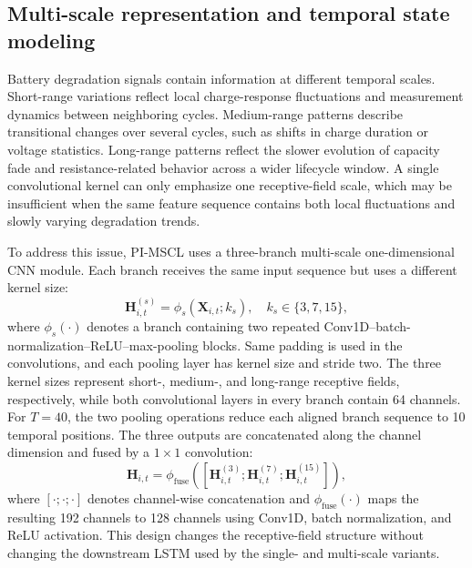 \documentclass[pdflatex,sn-mathphys-num]{sn-jnl}
\begin{document}
\subsection{Multi-scale representation and temporal state modeling}
\label{subsec:multiscale}

Battery degradation signals contain information at different temporal scales. Short-range variations reflect local charge-response fluctuations and measurement dynamics between neighboring cycles. Medium-range patterns describe transitional changes over several cycles, such as shifts in charge duration or voltage statistics. Long-range patterns reflect the slower evolution of capacity fade and resistance-related behavior across a wider lifecycle window. A single convolutional kernel can only emphasize one receptive-field scale, which may be insufficient when the same feature sequence contains both local fluctuations and slowly varying degradation trends.

To address this issue, PI-MSCL uses a three-branch multi-scale one-dimensional CNN module. Each branch receives the same input sequence but uses a different kernel size:
\begin{equation}
\mathbf{H}^{(s)}_{i,t}=\phi_{s}\left(\mathbf{X}_{i,t};k_s\right),
\quad k_s\in\{3,7,15\},
\label{eq:multiscale_branch}
\end{equation}
where $\phi_s(\cdot)$ denotes a branch containing two repeated Conv1D--batch-normalization--ReLU--max-pooling blocks. Same padding is used in the convolutions, and each pooling layer has kernel size and stride two. The three kernel sizes represent short-, medium-, and long-range receptive fields, respectively, while both convolutional layers in every branch contain 64 channels. For $T=40$, the two pooling operations reduce each aligned branch sequence to 10 temporal positions. The three outputs are concatenated along the channel dimension and fused by a $1\times1$ convolution:
\begin{equation}
\mathbf{H}_{i,t}=\phi_{\mathrm{fuse}}\left(
\left[\mathbf{H}^{(3)}_{i,t};\mathbf{H}^{(7)}_{i,t};\mathbf{H}^{(15)}_{i,t}\right]
\right),
\label{eq:multiscale_fusion}
\end{equation}
where $[\cdot;\cdot;\cdot]$ denotes channel-wise concatenation and $\phi_{\mathrm{fuse}}(\cdot)$ maps the resulting 192 channels to 128 channels using Conv1D, batch normalization, and ReLU activation. This design changes the receptive-field structure without changing the downstream LSTM used by the single- and multi-scale variants.
\end{document}
